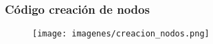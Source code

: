 \documentclass[hyperref={pdfpagelabels=false}]{beamer}
\begin{document}
\begin{frame}
\frametitle{C\'odigo creaci\'on de nodos}
\begin{figure}
        \begin{center}
            \texttt{[image: imagenes/creacion\_nodos.png]}
        \end{center}
    \end{figure}   

\end{frame}
\end{document}
